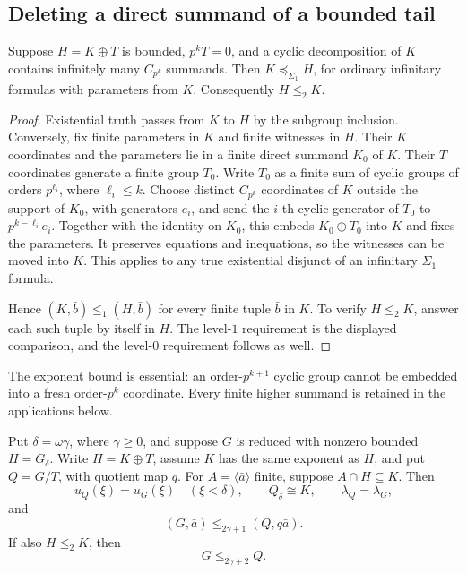 \documentclass[11pt]{article}
\begin{document}
\subsection{Deleting a direct summand of a bounded tail}
\begin{lemma}
\label{lem:absorption}
Suppose $H=K\oplus T$ is bounded, $p^kT=0$, and a cyclic decomposition of
$K$ contains infinitely many $C_{p^k}$ summands. Then
$K\preceq_{\Sigma_1}H$, for ordinary infinitary formulas with parameters
from $K$. Consequently $H\le_2K$.
\end{lemma}

\begin{proof}
Existential truth passes from $K$ to $H$ by the subgroup inclusion.
Conversely, fix finite parameters in $K$ and finite witnesses in $H$.
Their $K$ coordinates and the parameters lie in a finite direct summand
$K_0$ of $K$. Their $T$ coordinates generate a finite group $T_0$.
Write $T_0$ as a finite sum of cyclic groups of orders $p^{\ell_i}$,
where $\ell_i\le k$. Choose distinct $C_{p^k}$ coordinates of $K$
outside the support of $K_0$, with generators $e_i$, and send the
$i$-th cyclic generator of $T_0$ to $p^{k-\ell_i}e_i$.
Together with the identity on $K_0$, this embeds $K_0\oplus T_0$ into
$K$ and fixes the parameters. It preserves equations and inequations,
so the witnesses can be moved into $K$. This applies to any true
existential disjunct of an infinitary $\Sigma_1$ formula.

Hence $(K,\bar b)\le_1(H,\bar b)$ for every finite tuple $\bar b$ in
$K$. To verify $H\le_2K$, answer each such tuple by itself in $H$.
The level-$1$ requirement is the displayed comparison, and the
level-$0$ requirement follows as well.
\end{proof}

The exponent bound is essential: an order-$p^{k+1}$ cyclic group cannot
be embedded into a fresh order-$p^k$ coordinate. Every finite higher
summand is retained in the applications below.

\begin{lemma}
\label{lem:terminal-deletion}
Put $\delta=\omega\gamma$, where $\gamma\ge0$, and suppose $G$ is reduced
with nonzero bounded $H=G_\delta$. Write $H=K\oplus T$, assume $K$ has
the same exponent as $H$, and put $Q=G/T$, with quotient map $q$.
For $A=\langle\bar a\rangle$ finite, suppose $A\cap H\subseteq K$.
Then
\[
 u_Q(\xi)=u_G(\xi)\quad(\xi<\delta),\qquad Q_\delta\cong K,\qquad
 \lambda_Q=\lambda_G,
\]
and
\begin{equation}\label{eq:odd-deletion}
             (G,\bar a)\le_{2\gamma+1}(Q,q\bar a).
\end{equation}
If also $H\le_2K$, then
\begin{equation}\label{eq:even-deletion}
                         G\le_{2\gamma+2}Q.
\end{equation}
\end{lemma}
\end{document}
